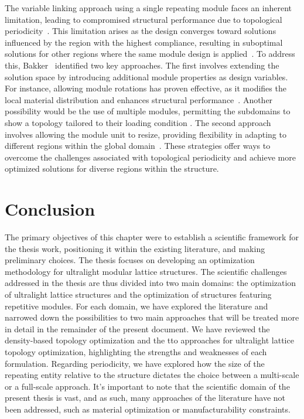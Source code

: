 The variable linking approach using a single repeating module faces an inherent limitation, leading to compromised structural performance due to topological periodicity~. This limitation arises as the design converges toward solutions influenced by the region with the highest compliance, resulting in suboptimal solutions for other regions where the same module design is applied~. To address this, Bakker~ identified two key approaches. The first involves extending the solution space by introducing additional module properties as design variables. For instance, allowing module rotations has proven effective, as it modifies the local material distribution and enhances structural performance~. Another possibility would be the use of multiple modules, permitting the subdomains to show a topology tailored to their loading condition . The second approach involves allowing the module unit to resize, providing flexibility in adapting to different regions within the global domain~. These strategies offer ways to overcome the challenges associated with topological periodicity and achieve more optimized solutions for diverse regions within the structure.

\section{Conclusion}
The primary objectives of this chapter were to establish a scientific framework for the thesis work, positioning it within the existing literature, and making preliminary choices. The thesis focuses on developing an optimization methodology for ultralight modular lattice structures. The scientific challenges addressed in the thesis are thus divided into two main domains: the optimization of ultralight lattice structures and the optimization of structures featuring repetitive modules. For each domain, we have explored the literature and narrowed down the possibilities to two main approaches that will be treated more in detail in the remainder of the present document. We have reviewed the density-based topology optimization and the \gls{tto} approaches for ultralight lattice topology optimization, highlighting the strengths and weaknesses of each formulation. Regarding periodicity, we have explored how the size of the repeating entity relative to the structure dictates the choice between a multi-scale or a full-scale approach. It's important to note that the scientific domain of the present thesis is vast, and as such, many approaches of the literature have not been addressed, such as material optimization or manufacturability constraints.
